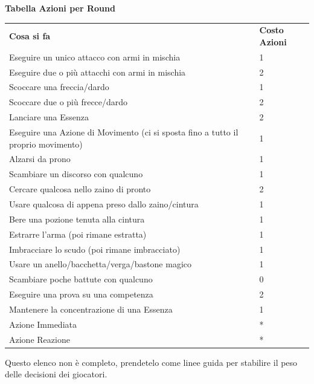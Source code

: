 \documentclass[a4paper,11pt,twoside,openany]{book}
\begin{document}
\medskip

\textbf{Tabella Azioni per Round}

\medskip

\begin{tabular}{ll}
	\toprule
	\textbf{Cosa si fa}                                & \textbf{Costo Azioni}\\
	Eseguire un unico attacco con armi in mischia      & 1\\
	Eseguire due o più attacchi con armi in mischia    & 2\\
	Scoccare una freccia/dardo                         & 1\\
	Scoccare due o più frecce/dardo                    & 2\\
	Lanciare una Essenza                               & 2\\
	Eseguire una Azione di Movimento (ci si sposta fino a tutto
	il proprio movimento)                              & 1\\
	Alzarsi da prono                                   & 1 \\
	Scambiare un discorso con qualcuno                 & 1\\
	Cercare qualcosa nello zaino di pronto             & 2\\
	Usare qualcosa di appena preso dallo zaino/cintura & 1\\
	Bere una pozione tenuta alla cintura               & 1\\
	Estrarre l'arma (poi rimane estratta)              & 1\\
	Imbracciare lo scudo (poi rimane imbracciato)      & 1\\
	Usare un anello/bacchetta/verga/bastone magico     & 1\\
	Scambiare poche battute con qualcuno               & 0\\
	Eseguire una prova su una competenza               & 2\\
	Mantenere la concentrazione di una Essenza         & 1\\
	Azione Immediata                                   & {*}\\
	Azione Reazione                                    & {*}\\
\end{tabular}

\smallskip

Questo elenco non è completo, prendetelo come linee guida per stabilire il peso delle decisioni dei giocatori.

\bigskip
\end{document}
